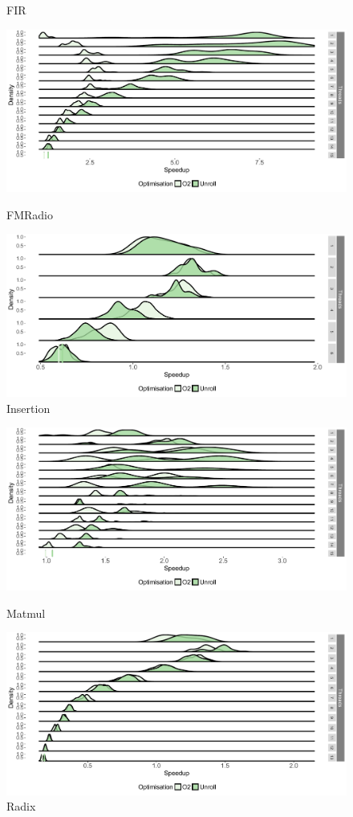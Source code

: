 \begin{appendices}
\begin{figure}[t]
\caption{FIR}\label{chp:stream:fit}
\center
\includegraphics[width=1\textwidth]{streamit-paper/graphics/appendixgraphs/fm-total2.pdf}
\caption{FMRadio}\label{chp:stream:fmt}
\center
\includegraphics[width=1\textwidth]{streamit-paper/graphics/appendixgraphs/insertion-total2.pdf}
\caption{Insertion}\label{chp:stream:it}

\end{figure}
\begin{figure}[t]
\center
\includegraphics[width=1\textwidth]{streamit-paper/graphics/appendixgraphs/matmul-total2.pdf}
\caption{Matmul}\label{chp:stream:mt}
 \includegraphics[width=1\textwidth]{streamit-paper/graphics/appendixgraphs/radix-total2.pdf}
\caption{Radix}\label{chp:stream:rt}
\end{figure} 


\end{appendices}
